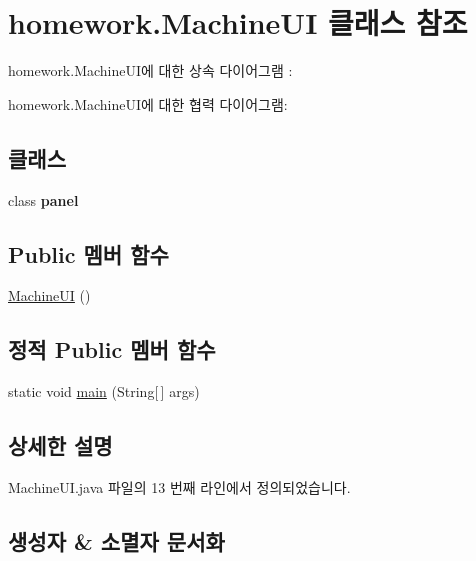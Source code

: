 \hypertarget{classhomework_1_1_machine_u_i}{}\section{homework.\+Machine\+UI 클래스 참조}
\label{classhomework_1_1_machine_u_i}


homework.\+Machine\+U\+I에 대한 상속 다이어그램 \+: 


homework.\+Machine\+U\+I에 대한 협력 다이어그램\+:
\subsection*{클래스}
\begin{DoxyCompactItemize}
\item 
class {\bfseries panel}
\end{DoxyCompactItemize}
\subsection*{Public 멤버 함수}
\begin{DoxyCompactItemize}
\item 
\hyperlink{classhomework_1_1_machine_u_i_a0e2b7895984cb257668698ac745b4dc3}{Machine\+UI} ()
\end{DoxyCompactItemize}
\subsection*{정적 Public 멤버 함수}
\begin{DoxyCompactItemize}
\item 
static void \hyperlink{classhomework_1_1_machine_u_i_aaf1dedcb82c6fd171d2af67e4b5d604d}{main} (String\mbox{[}$\,$\mbox{]} args)
\end{DoxyCompactItemize}


\subsection{상세한 설명}


Machine\+U\+I.\+java 파일의 13 번째 라인에서 정의되었습니다.



\subsection{생성자 \& 소멸자 문서화}
